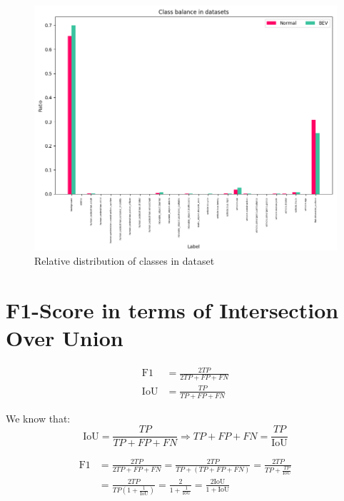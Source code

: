 \begin{figure}[h!]
    \centering
    \includegraphics[width=\linewidth]{images/appendix/dataset_class_balance_ratio.png}
    \caption{Relative distribution of classes in dataset}
    \label{fig:dataset_class_balance_ratio}
\end{figure}



\section{F1-Score in terms of Intersection Over Union} \label{appendix:f1_iou}
\begin{equation}
    \begin{aligned}
    \text{F1} &= \frac{2TP}{2TP + FP + FN} \\
    \text{IoU} &= \frac{TP}{TP + FP + FN}
    \end{aligned}
\end{equation}
    
\noindent
We know that:
\[
\text{IoU} = \frac{TP}{TP + FP + FN} \Rightarrow TP + FP + FN = \frac{TP}{\text{IoU}}
\]

\begin{equation}
    \begin{aligned}
        \text{F1} &= \frac{2TP}{2TP + FP + FN} = \frac{2TP}{TP + (TP + FP + FN)} = \frac{2TP}{TP + \frac{TP}{\text{IoU}}} \\
        &= \frac{2TP}{TP \left(1 + \frac{1}{\text{IoU}}\right)} = \frac{2}{1 + \frac{1}{\text{IoU}}} = \frac{2\text{IoU}}{1 + \text{IoU}}
    \end{aligned}
\end{equation}
    

